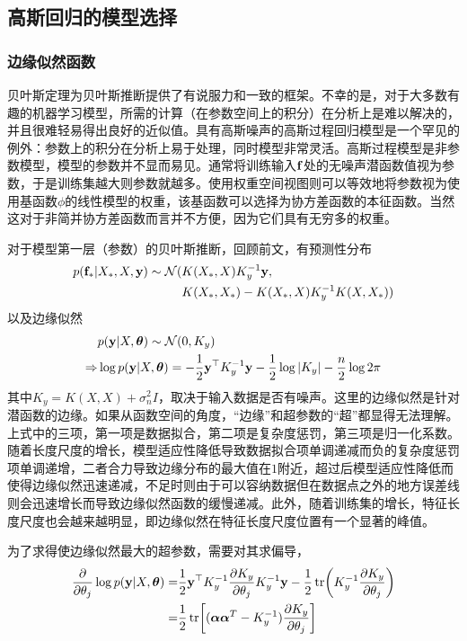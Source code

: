 \documentclass[12pt,UTF8]{article}
\begin{document}
        \subsection{高斯回归的模型选择}
            \subsubsection{边缘似然函数}
                贝叶斯定理为贝叶斯推断提供了有说服力和一致的框架。不幸的是，对于大多数有趣的机器学习模型，所需的计算（在参数空间上的积分）在分析上是难以解决的，并且很难轻易得出良好的近似值。具有高斯噪声的高斯过程回归模型是一个罕见的例外：参数上的积分在分析上易于处理，同时模型非常灵活。高斯过程模型是非参数模型，模型的参数并不显而易见。通常将训练输入$\vb{f}$处的无噪声潜函数值视为参数，于是训练集越大则参数就越多。使用权重空间视图则可以等效地将参数视为使用基函数$\phi$的线性模型的权重，该基函数可以选择为协方差函数的本征函数。当然这对于非简并协方差函数而言并不方便，因为它们具有无穷多的权重。\par
                对于模型第一层（参数）的贝叶斯推断，回顾前文，有预测性分布
                \begin{align}
                    p(\vb{f}_*|X_*,X,\vb{y})\sim\mathcal{N}(&K(X_*,X)K_y^{-1}\vb{y},\nonumber \\
                    &K(X_*,X_*)-K(X_*,X)K_y^{-1}K(X,X_*))
                \end{align}
                以及边缘似然
                \begin{align}
                    &p(\vb{y}|X,\vb*{\theta})\sim\mathcal{N}(0,K_y)\\
                    \Rightarrow&\log{p(\vb{y}|X,\vb*{\theta})}=-\frac{1}{2}\vb{y}^\top K_y^{-1}\vb{y}-\frac{1}{2}\log{\abs{K_y}}-\frac{n}{2}\log{2\pi}
                \end{align}
                其中$K_y=K(X,X)+\sigma_n^2I$，取决于输入数据是否有噪声。这里的边缘似然是针对潜函数的边缘。如果从函数空间的角度，“边缘”和超参数的“超”都显得无法理解。上式中的三项，第一项是数据拟合，第二项是复杂度惩罚，第三项是归一化系数。随着长度尺度的增长，模型适应性降低导致数据拟合项单调递减而负的复杂度惩罚项单调递增，二者合力导致边缘分布的最大值在$1$附近，超过后模型适应性降低而使得边缘似然迅速递减，不足时则由于可以容纳数据但在数据点之外的地方误差线则会迅速增长而导致边缘似然函数的缓慢递减。此外，随着训练集的增长，特征长度尺度也会越来越明显，即边缘似然在特征长度尺度位置有一个显著的峰值。\par
                为了求得使边缘似然最大的超参数，需要对其求偏导，
                \begin{align}
                    \pdv{\theta_j} \log{p(\vb{y}|X,\vb*{\theta})}=&\frac{1}{2}\vb{y}^\top K_y^{-1}\pdv{K_y}{\theta_j}K_y^{-1}\vb{y}-\frac{1}{2}\tr(K_y^{-1}\pdv{K_y}{\theta_j}) \\
                    =&\frac{1}{2}\tr[(\vb*{\alpha}\vb*{\alpha}^T-K_y^{-1})\pdv{K_y}{\theta_j}]
                \end{align}
\end{document}
